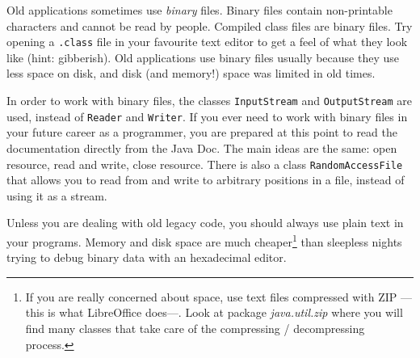Old applications sometimes use \emph{binary} files. Binary files
contain non-printable characters and cannot be read by
people. Compiled class files are binary files. Try
opening a \verb+.class+ file in your favourite text editor to get a
feel of what they look like (hint: gibberish). Old applications use
binary files usually because they use less space on disk, and disk (and
memory!) space was limited in old times. 

In order to work with binary files, the classes \verb+InputStream+ and
\verb+OutputStream+ are used, instead of \verb+Reader+ and
\verb+Writer+. If you ever need to work with binary files in your
future career as a programmer, you are prepared at this point to read
the documentation directly from the Java Doc. The main ideas are the
same: open resource, read and write, close resource. There is also a
class \verb+RandomAccessFile+ that allows you to read from and write
to arbitrary positions in a file, instead of using it as a stream. 

Unless you are dealing with old legacy code, you should always use
plain text in your programs. Memory and disk space are much 
cheaper\footnote{If you are really concerned about space, use text
  files compressed with ZIP ---this is what LibreOffice does---. Look
  at package \emph{java.util.zip} where you will find many classes
  that take care of the compressing / decompressing process.} 
than sleepless nights trying to debug binary data with an
hexadecimal editor. 



